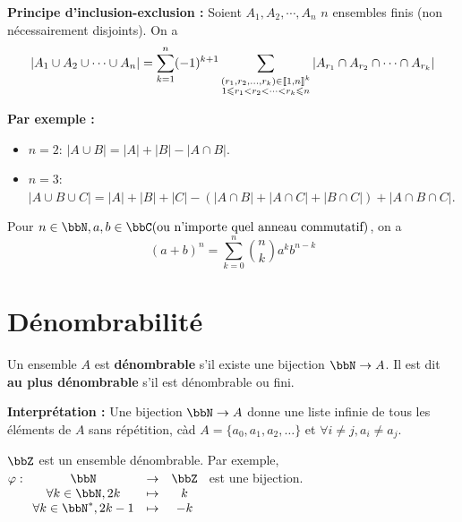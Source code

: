 \textbf{Principe d'inclusion-exclusion :}
Soient $A_1, A_2, \cdots, A_n$ $n$ ensembles finis (non nécessairement disjoints). On a
\[ |A_1 \cup A_2 \cup \cdots \cup A_n|
    = \sum\limits_{k = 1}^n (-1)^{k + 1}
    \sum\limits_{\substack{(r_1, r_2, \ldots, r_k) \in \llbracket 1, n \rrbracket^k \\ 1 \leqslant r_1 < r_2 < \cdots < r_k \leqslant n}}
    |A_{r_1} \cap A_{r_2} \cap \cdots \cap A_{r_k}| \]

\textbf{Par exemple :}
\begin{itemize}
    \item $n = 2$: $|A \cup B| = |A| + |B| - |A \cap B|$.
    \item $n = 3$: $|A \cup B \cup C| = |A| + |B| + |C| - (|A \cap B| + |A \cap C| + |B \cap C|) + |A \cap B \cap C|$.
\end{itemize}

\begin{thm}
    Pour $n \in \bbN, a, b \in \bbC (\text{ou n'importe quel anneau commutatif})$, on a
    \[ (a + b)^n = \sum\limits_{k = 0}^n \binom{n}{k} a^k b^{n-k} \]
\end{thm}

\section{Dénombrabilité}

\begin{deff}
    Un ensemble $A$ est \textbf{dénombrable} s'il existe une bijection $\bbN \to A$.
    Il est dit \textbf{au plus dénombrable} s'il est dénombrable ou fini.
\end{deff}

\textbf{Interprétation :}
Une bijection $\bbN \to A$ donne une liste infinie de tous les éléments de $A$ sans répétition,
càd $A = \{ a_0, a_1, a_2, \ldots \}$ et $\forall i \neq j, a_i \neq a_j$.

\begin{exem}
    $\bbZ$ est un ensemble dénombrable.
    Par exemple, $\varphi:
        \begin{array}[t]{ccc}
            \bbN                         & \to & \bbZ \\
            \forall k \in \bbN, 2k       & \tp & k    \\
            \forall k \in \bbN^*, 2k - 1 & \tp & -k
        \end{array}
    $ est une bijection.
\end{exem}

